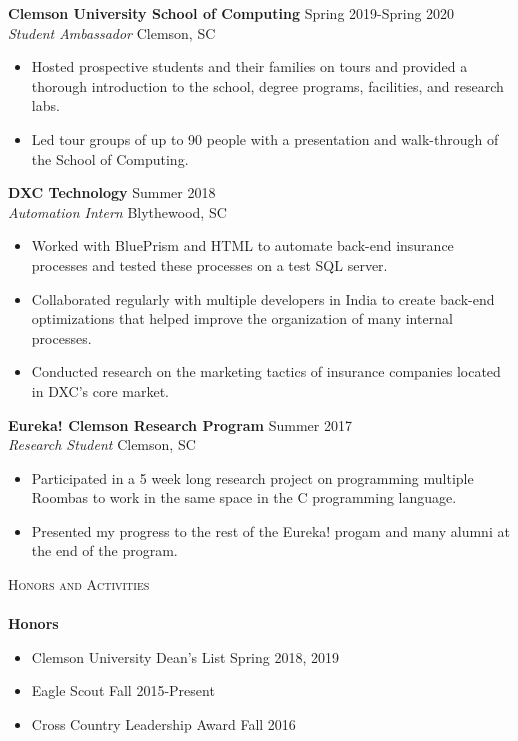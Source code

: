 \documentclass[a4paper]{article}
\newcommand{\lineunder} {
    \vspace*{-8pt} \\
    \hspace*{-18pt} \hrulefill \\
}
\newcommand{\header} [1] {
    {\hspace*{-18pt}\vspace*{6pt} \textsc{#1}}
    \vspace*{-6pt} \lineunder
}
\newcommand{\beginninglist} [4] {
	
	\noindent \textbf{#1} \hfill \hfill #3\\ \noindent \textit{#2} \hfill \hfill #4 \\    
}
\begin{document}
\beginninglist {Clemson University School of Computing} {Student Ambassador} {Spring 2019-Spring 2020} {Clemson, SC} \vspace{-8pt}
\begin{itemize}
	\item Hosted prospective students and their families on tours and provided a thorough introduction to the school, degree programs, facilities, and research labs.\vspace{-5pt}
	\item Led tour groups of up to 90 people with a presentation and walk-through of the School of Computing. \vspace{-5pt}
\end{itemize}	
\beginninglist {DXC Technology} {Automation Intern} {Summer 2018} {Blythewood, SC} \vspace{-8pt}
\begin{itemize}
	\item Worked with BluePrism and HTML to automate back-end insurance processes and tested these processes on a test SQL server.\vspace{-5pt}
	\item Collaborated regularly with multiple developers in India to create back-end optimizations that helped improve the organization of many internal processes.\vspace{-5pt}
	\item Conducted research on the marketing tactics of insurance companies located in DXC's core market.\vspace{-5pt}
\end{itemize}

\beginninglist {Eureka! Clemson Research Program} {Research Student} {Summer 2017} {Clemson, SC}
\vspace{-8pt}
\begin{itemize}
	\item Participated in a 5 week long research project on programming multiple Roombas to work in the same space in the C programming language.  \vspace{-5pt}
	\item Presented my progress to the rest of the Eureka! progam and many alumni at the end of the program. \vspace{-5pt}
\end{itemize}

\header {Honors and Activities}

\textbf{Honors}

\begin{itemize}
\vspace{-10pt}
\item Clemson University Dean's List \hfill \hfill Spring 2018, 2019 \vspace{-5pt} 
\item Eagle Scout \hfill \hfill Fall 2015-Present \vspace{-5pt}
\item Cross Country Leadership Award \hfill \hfill Fall 2016 \vspace{-5pt}
\end{itemize}
\end{document}
